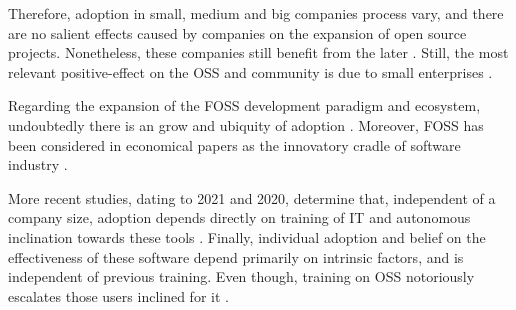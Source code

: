 \documentclass[
12pt,				%
openright,			%
oneside,			%
a4paper,			%
brazil,				%
english,			%
]{abntex2}
\begin{document}

Therefore, adoption in small, medium and big companies process vary,
and there are no salient effects caused by companies on the expansion
of open source projects. Nonetheless, these companies still benefit
from the later \cite{spinellis2012organizational,hauge2008adoption,
  fitzgerald2006transformation}. Still, the most relevant positive-effect on
the OSS and community is due to small enterprises \cite{kshetri2004economics}.  

Regarding the expansion of the FOSS development paradigm and
ecosystem, undoubtedly there is an grow and ubiquity of adoption
\cite{schmidt2016agile}. Moreover, FOSS has been considered in
economical papers as the innovatory cradle of software industry \cite{schrape2019open,schmidt2016agile}.


More recent studies, dating to 2021 and 2020, determine that,
independent of a company size, adoption depends directly on training
of IT and autonomous inclination towards these tools
\cite{racero2020predicting}. Finally, individual adoption and belief
on the effectiveness of these software depend primarily on intrinsic
factors, and is independent of previous training. Even though,
training on OSS notoriously escalates those users inclined for it \cite{racero2021can}.       
\end{document}
